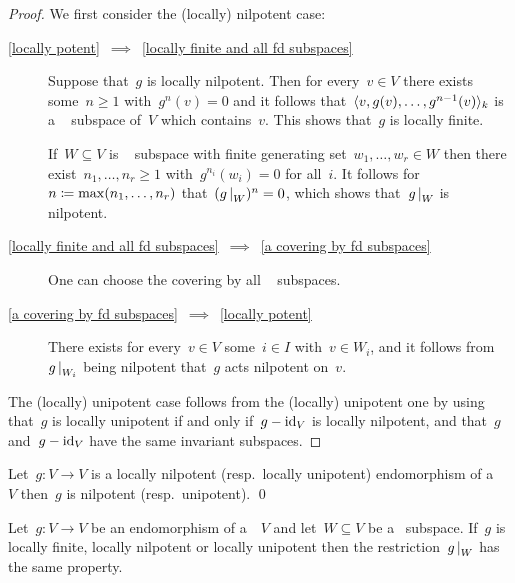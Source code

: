 \begin{proof}
  \label{characterization of locally potent endomorphisms}
  We first consider the (locally) nilpotent case:
  \begin{description}
    \item[\ref*{locally potent}~$\implies$~\ref*{locally finite and all fd subspaces}]
      Suppose that~$g$ is locally nilpotent.
      Then for every~$v \in V$ there exists some~$n \geq 1$ with~$g^n(v) = 0$ and it follows that~$\langle v, g(v), \dotsc, g^{n-1}(v) \rangle_k$ is a ~ subspace of~$V$ which contains~$v$.
      This shows that~$g$ is locally finite.
      
      If~$W \subseteq V$ is ~ subspace with finite generating set~$w_1, \dotsc, w_r \in W$ then there exist~$n_1, \dotsc, n_r \geq 1$ with~$g^{n_i}(w_i) = 0$ for all~$i$. It follows for~$n \coloneqq \max(n_1, \dotsc, n_r)$ that~$(\restrict{g}{W})^n = 0$, which shows that~$\restrict{g}{W}$ is nilpotent.
    \item[\ref*{locally finite and all fd subspaces}~$\implies$~\ref*{a covering by fd subspaces}]
      One can choose the covering by all ~ subspaces.
    \item[\ref*{a covering by fd subspaces}~$\implies$~\ref*{locally potent}]
      There exists for every~$v \in V$ some~$i \in I$ with~$v \in W_i$, and it follows from~$\restrict{g}{W_i}$ being nilpotent that~$g$ acts nilpotent on~$v$.
  \end{description}
  The (locally) unipotent case follows from the (locally) unipotent one by using that~$g$ is locally unipotent if and only if~$g - \operatorname{id}_V$ is locally nilpotent, and that~$g$ and~$g - \operatorname{id}_V$ have the same invariant subspaces.
\end{proof}


\begin{corollary}
  Let~$g \colon V \to V$ is a locally nilpotent (resp.\ locally unipotent) endomorphism of a ~~$V$ then~$g$ is nilpotent (resp.\ unipotent).
  \qed
\end{corollary}


\begin{lemma}
  \label{restriction of ss and locally potent endomorphisms }
  Let~$g \colon V \to V$ be an endomorphism of a~~$V$ and let~$W \subseteq V$ be a~ subspace.
  If~$g$ is locally finite, locally nilpotent or locally unipotent then the restriction~$\restrict{g}{W}$ has the same property.
\end{lemma}


